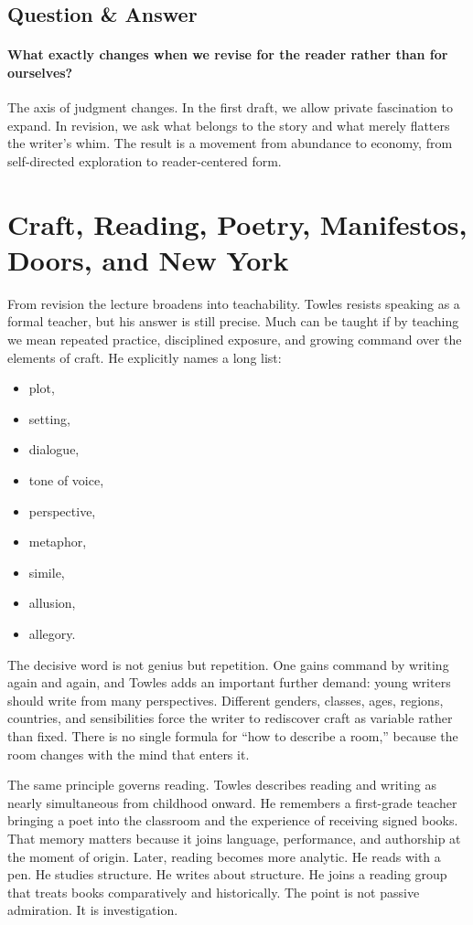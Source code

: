 \subsection{Question \& Answer}

\paragraph{What exactly changes when we revise for the reader rather than for ourselves?}

The axis of judgment changes. In the first draft, we allow private fascination to expand. In revision, we ask what belongs to the story and what merely flatters the writer's whim. The result is a movement from abundance to economy, from self-directed exploration to reader-centered form.

\section{Craft, Reading, Poetry, Manifestos, Doors, and New York}

From revision the lecture broadens into teachability. Towles resists speaking as a formal teacher, but his answer is still precise. Much can be taught if by teaching we mean repeated practice, disciplined exposure, and growing command over the elements of craft. He explicitly names a long list:
\begin{itemize}
\item plot,
\item setting,
\item dialogue,
\item tone of voice,
\item perspective,
\item metaphor,
\item simile,
\item allusion,
\item allegory.
\end{itemize}
The decisive word is not genius but repetition. One gains command by writing again and again, and Towles adds an important further demand: young writers should write from many perspectives. Different genders, classes, ages, regions, countries, and sensibilities force the writer to rediscover craft as variable rather than fixed. There is no single formula for ``how to describe a room,'' because the room changes with the mind that enters it.

The same principle governs reading. Towles describes reading and writing as nearly simultaneous from childhood onward. He remembers a first-grade teacher bringing a poet into the classroom and the experience of receiving signed books. That memory matters because it joins language, performance, and authorship at the moment of origin. Later, reading becomes more analytic. He reads with a pen. He studies structure. He writes about structure. He joins a reading group that treats books comparatively and historically. The point is not passive admiration. It is investigation.

